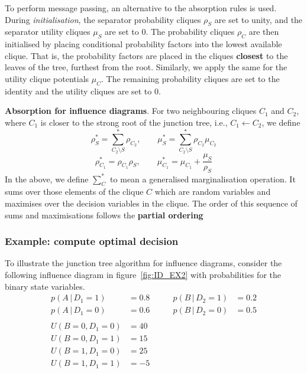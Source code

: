 \documentclass{article}
\newcommand{\giv}{\,|\,}
\begin{document}
To perform message passing, an alternative to the absorption rules is used. During \textit{initialisation}, the separator probability cliques $\rho_S$ are set to unity, and the separator utility cliques $\mu_S$ are set to 0. The probability cliques $\rho_C$ are then initialised by placing conditional probability factors into the lowest available clique. That is, the probability factors are placed in the cliques \textbf{closest} to the leaves of the tree, furthest from the root. Similarly, we apply the same for the utility clique potentials $\mu_C$. The remaining probability cliques are set to the identity and the utility cliques are set to 0.   
\\
\begin{theorem}
    \textbf{Absorption for influence diagrams}. For two neighbouring cliques $C_1$ and $C_2$, where $C_1$ is closer to the strong root of the junction tree, i.e., $C_1 \leftarrow C_2$, we define
    $$
        \rho_S^* = \sum_{C_2\text{\textbackslash}S}^* \rho_{C_2}, \qquad \mu_S^* = \sum_{C_2\text{\textbackslash}S}^* \rho_{C_2} \mu_{C_2}
    $$
    $$
        \rho_{C_1}^* = \rho_{C_1}\rho_S, \qquad \mu_{C_1}^* = \mu_{C_1} + \frac{\mu_S}{\rho_S}
    $$
    In the above, we define $\sum_C^*$ to mean a generalised marginalisation operation. It sums over those elements of the clique $C$ which are random variables and maximises over the decision variables in the clique. The order of this sequence of sums and maximisations follows the \textbf{partial ordering} 
\end{theorem}

\subsubsection{Example: compute optimal decision}

To illustrate the junction tree algorithm for influence diagrams, consider the following influence diagram in figure~\ref{fig:ID_EX2} with probabilities for the binary state variables. 
\begin{align*}
    p(A \giv D_1 = 1) &= 0.8 \qquad & p(B \giv D_2 = 1) &= 0.2 \\
    p(A \giv D_1 = 0) &= 0.6 \qquad & p(B \giv D_2 = 0) &= 0.5 \\\\
    U(B=0, D_1=0) &= 40\\
    U(B=0, D_1=1) &= 15\\
    U(B=1, D_1=0) &= 25\\
    U(B=1, D_1=1) &= -5
\end{align*}
\end{document}
